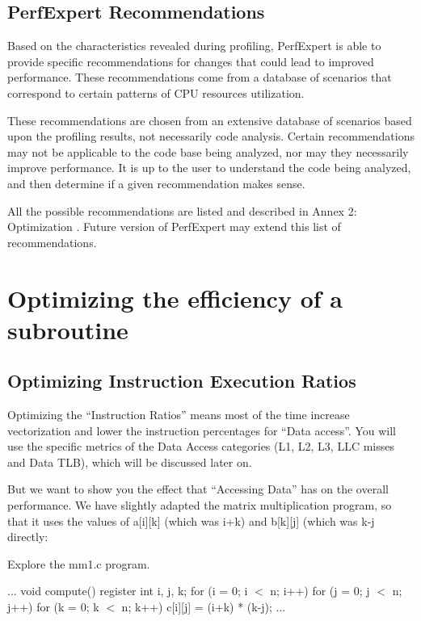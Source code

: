 \subsection{PerfExpert Recommendations}
\label{subsec:Recommendations}

Based on the characteristics revealed during profiling, PerfExpert is able to provide specific recommendations for changes that could lead to improved performance. These recommendations come from a database of scenarios that correspond to certain patterns of CPU resources utilization.

These recommendations are chosen from an extensive database of scenarios based upon the profiling results, not necessarily code analysis. Certain recommendations may not be applicable to the code base being analyzed, nor may they necessarily improve performance. It is up to the user to understand the code being analyzed, and then determine if a given recommendation makes sense.

All the possible recommendations are listed and described in Annex 2: Optimization . Future version of PerfExpert may extend this list of recommendations.

\section{Optimizing the efficiency of a subroutine}
\label{sec:Optimizing_the_efficiency_of_a_subroutine}

\subsection{Optimizing Instruction Execution Ratios}
\label{subsec:Optimizing_Instruction_Execution_Ratios}

Optimizing the ``Instruction Ratios'' means most of the time increase vectorization and lower the instruction percentages for ``Data access''. You will use the specific metrics of the Data Access categories (L1, L2, L3, LLC misses and Data TLB), which will be discussed later on.

But we want to show you the effect that ``Accessing Data'' has on the overall performance. We have slightly adapted the matrix multiplication program, so that it uses the values of a[i][k] (which was i+k) and b[k][j] (which was k-j directly:

Explore the mm1.c program.

\begin{prompt}
...
void compute()
{
 register int i, j, k;
 for (i = 0; i $<$ n; i++)
   for (j = 0; j $<$ n; j++)
     for (k = 0; k $<$ n; k++)
       c[i][j] = (i+k) * (k-j);
}
...
\end{prompt}

